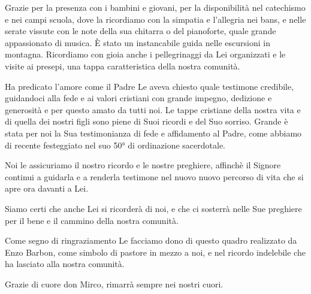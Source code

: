 Grazie per la presenza con i bambini e giovani, per la disponibilità nel catechismo e nei campi scuola, dove la ricordiamo con la simpatia e l'allegria nei bans, e nelle serate vissute con le note della sua chitarra o del pianoforte, quale grande appassionato di musica. È stato un instancabile guida nelle escursioni in montagna. Ricordiamo con gioia anche i pellegrinaggi da Lei organizzati e le visite ai presepi, una tappa caratteristica della nostra comunità.

Ha predicato l'amore come il Padre Le aveva chiesto quale testimone credibile, guidandoci alla fede e ai valori cristiani con grande impegno, dedizione e generosità e per questo amato da tutti noi. Le tappe cristiane della nostra vita e di quella dei nostri figli sono piene di Suoi ricordi e del Suo sorriso. Grande è stata per noi la Sua testimonianza di fede e affidamento al Padre, come abbiamo di recente festeggiato nel suo 50° di ordinazione sacerdotale.

Noi le assicuriamo il nostro ricordo e le nostre preghiere, affinchè il Signore continui a guidarla e a renderla testimone nel nuovo nuovo percorso di vita che si apre ora davanti a Lei.

Siamo certi che anche Lei si ricorderà di noi, e che ci sosterrà nelle Sue preghiere per il bene e il cammino della nostra comunità.

Come segno di ringraziamento Le facciamo dono di questo quadro realizzato da Enzo Barbon, come simbolo di pastore in mezzo a noi, e nel ricordo indelebile che ha lasciato alla nostra comunità.


Grazie di cuore don Mirco, rimarrà sempre nei nostri cuori.

